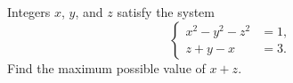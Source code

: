 Integers $x$, $y$, and $z$ satisfy the system \[\left\{\begin{aligned} x^{2}-y^{2}-z^{2} &=1, \\ z+y-x &=3. \end{aligned}\right.\]Find the maximum possible value of $x+z$.
